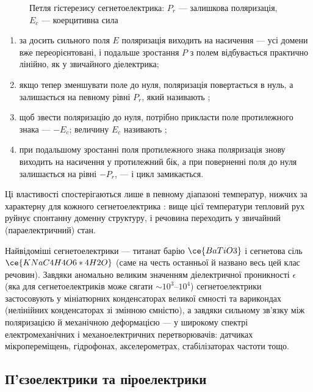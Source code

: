 \begin{figure}[h!]\centering
	\caption{Петля гістерезису сегнетоелектрика: $P_r$ --- залишкова поляризація, $E_c$ ---
		коерцитивна сила\label{pic:Hysteresis}}
\end{figure}
\begin{enumerate}
	\item за досить сильного поля $E$ поляризація виходить на насичення --- усі домени вже переорієнтовані, і подальше зростання $P$ з полем
	      відбувається практично лінійно, як у звичайного діелектрика;
	\item якщо тепер зменшувати поле до нуля, поляризація  повертається в нуль, а залишається на певному рівні $P_r$, який називають
	      ;
	\item щоб звести поляризацію до нуля, потрібно прикласти поле протилежного знака --- $-E_c$; величину $E_c$ називають ;
	\item при подальшому зростанні поля протилежного знака поляризація знову виходить на насичення у протилежний бік, а при поверненні поля до нуля
	      залишається на рівні $-P_r$, --- і цикл замикається.
\end{enumerate}
Ці властивості спостерігаються лише в певному діапазоні температур, нижчих за характерну для кожного сегнетоелектрика : вище
цієї температури тепловий рух руйнує спонтанну доменну структуру, і речовина переходить у звичайний (параелектричний) стан.

Найвідоміші сегнетоелектрики --- титанат барію $\ce{BaTiO3}$ і сегнетова сіль $\ce{KNaC4H4O6*4H2O}$ (саме на честь останньої й названо весь цей клас
речовин). Завдяки аномально великим значенням діелектричної проникності $\epsilon$ (яка для сегнетоелектриків може сягати $\sim 10^3$--$10^4$)
сегнетоелектрики застосовують у мініатюрних конденсаторах великої ємності та варикондах (нелінійних конденсаторах зі змінною ємністю), а завдяки
сильному зв'язку між поляризацією й механічною деформацією --- у широкому спектрі електромеханічних і механоелектричних перетворювачів: датчиках
мікропереміщень, гідрофонах, акселерометрах, стабілізаторах частоти тощо.

\subsection*{П'єзоелектрики та піроелектрики}\label{sec:PiezoPyro}

